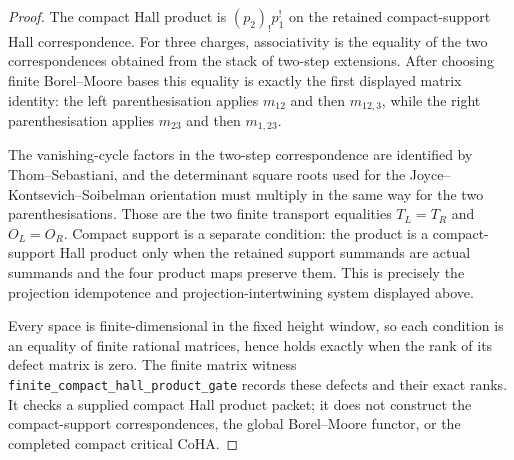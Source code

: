 \begin{proof}
The compact Hall product is
\((p_2)_!p_1^!\) on the retained compact-support Hall correspondence.
For three charges, associativity is the equality of the two
correspondences obtained from the stack of two-step extensions. After
choosing finite Borel--Moore bases this equality is exactly the first
displayed matrix identity: the left parenthesisation applies
\(m_{12}\) and then \(m_{12,3}\), while the right parenthesisation
applies \(m_{23}\) and then \(m_{1,23}\).

The vanishing-cycle factors in the two-step correspondence are
identified by Thom--Sebastiani, and the determinant square roots used
for the Joyce--Kontsevich--Soibelman orientation must multiply in the
same way for the two parenthesisations. Those are the two finite
transport equalities \(T_L=T_R\) and \(O_L=O_R\). Compact support is a
separate condition: the product is a compact-support Hall product only
when the retained support summands are actual summands and the four
product maps preserve them. This is precisely the projection
idempotence and projection-intertwining system displayed above.

Every space is finite-dimensional in the fixed height window, so each
condition is an equality of finite rational matrices, hence holds
exactly when the rank of its defect matrix is zero. The finite matrix
witness \texttt{finite\_compact\_hall\_product\_gate} records these
defects and their exact ranks. It checks a supplied compact Hall product
packet; it does not construct the compact-support correspondences, the
global Borel--Moore functor, or the completed compact critical CoHA.
\end{proof}

